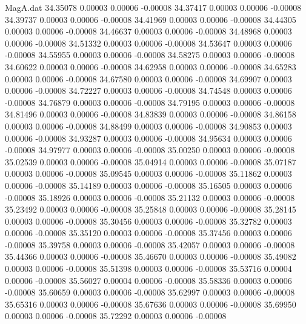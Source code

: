 \begin{filecontents}{MagA.dat}
  34.35078    0.00003    0.00006   -0.00008
  34.37417    0.00003    0.00006   -0.00008
  34.39737    0.00003    0.00006   -0.00008
  34.41969    0.00003    0.00006   -0.00008
  34.44305    0.00003    0.00006   -0.00008
  34.46637    0.00003    0.00006   -0.00008
  34.48968    0.00003    0.00006   -0.00008
  34.51332    0.00003    0.00006   -0.00008
  34.53647    0.00003    0.00006   -0.00008
  34.55955    0.00003    0.00006   -0.00008
  34.58275    0.00003    0.00006   -0.00008
  34.60622    0.00003    0.00006   -0.00008
  34.62958    0.00003    0.00006   -0.00008
  34.65283    0.00003    0.00006   -0.00008
  34.67580    0.00003    0.00006   -0.00008
  34.69907    0.00003    0.00006   -0.00008
  34.72227    0.00003    0.00006   -0.00008
  34.74548    0.00003    0.00006   -0.00008
  34.76879    0.00003    0.00006   -0.00008
  34.79195    0.00003    0.00006   -0.00008
  34.81496    0.00003    0.00006   -0.00008
  34.83839    0.00003    0.00006   -0.00008
  34.86158    0.00003    0.00006   -0.00008
  34.88499    0.00003    0.00006   -0.00008
  34.90853    0.00003    0.00006   -0.00008
  34.93287    0.00003    0.00006   -0.00008
  34.95634    0.00003    0.00006   -0.00008
  34.97977    0.00003    0.00006   -0.00008
  35.00250    0.00003    0.00006   -0.00008
  35.02539    0.00003    0.00006   -0.00008
  35.04914    0.00003    0.00006   -0.00008
  35.07187    0.00003    0.00006   -0.00008
  35.09545    0.00003    0.00006   -0.00008
  35.11862    0.00003    0.00006   -0.00008
  35.14189    0.00003    0.00006   -0.00008
  35.16505    0.00003    0.00006   -0.00008
  35.18926    0.00003    0.00006   -0.00008
  35.21132    0.00003    0.00006   -0.00008
  35.23492    0.00003    0.00006   -0.00008
  35.25848    0.00003    0.00006   -0.00008
  35.28145    0.00003    0.00006   -0.00008
  35.30456    0.00003    0.00006   -0.00008
  35.32782    0.00003    0.00006   -0.00008
  35.35120    0.00003    0.00006   -0.00008
  35.37456    0.00003    0.00006   -0.00008
  35.39758    0.00003    0.00006   -0.00008
  35.42057    0.00003    0.00006   -0.00008
  35.44366    0.00003    0.00006   -0.00008
  35.46670    0.00003    0.00006   -0.00008
  35.49082    0.00003    0.00006   -0.00008
  35.51398    0.00003    0.00006   -0.00008
  35.53716    0.00004    0.00006   -0.00008
  35.56027    0.00004    0.00006   -0.00008
  35.58336    0.00003    0.00006   -0.00008
  35.60659    0.00003    0.00006   -0.00008
  35.62997    0.00003    0.00006   -0.00008
  35.65316    0.00003    0.00006   -0.00008
  35.67636    0.00003    0.00006   -0.00008
  35.69950    0.00003    0.00006   -0.00008
  35.72292    0.00003    0.00006   -0.00008

\end{filecontents}
